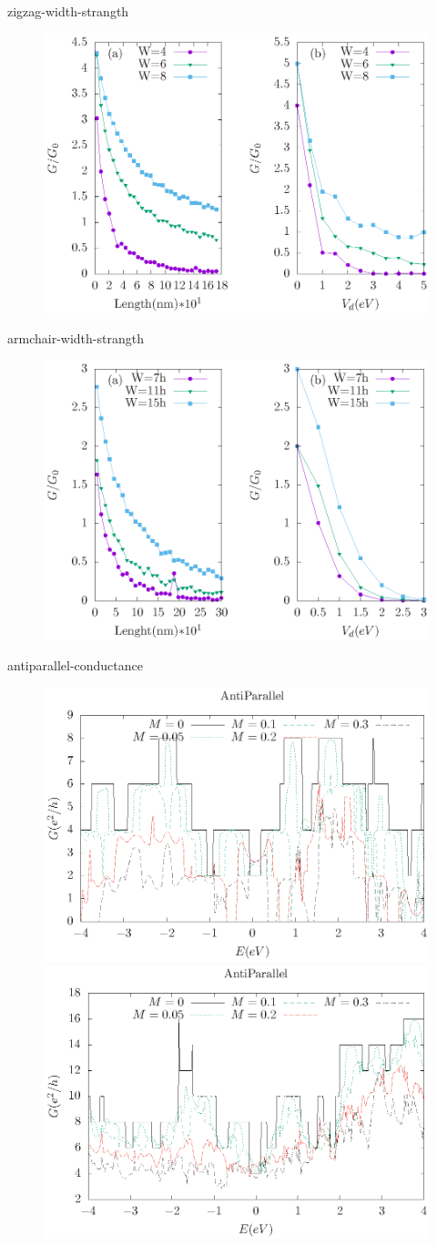 \documentclass[handout,t]{beamer}
\begin{document}
\begin{frame}{zigzag-width-strangth}
	\begin{figure}[ht]
		\centering
		\includegraphics[width=0.5\linewidth]{../figures/zigzag-width-strangth-thesis.eps}
	  \end{figure}
\end{frame}

\begin{frame}{armchair-width-strangth}
	\begin{figure}[ht]
		\centering
		\includegraphics[width=.5\linewidth]{../figures/armchair-width-strangth-thesis.eps}
	  \end{figure}
\end{frame}


\begin{frame}{antiparallel-conductance}
	\begin{figure}
		\includegraphics[width=.45\linewidth]{../figures/armchair-antiparallel-conductance-revise-thesis.eps}
		\includegraphics[width=.45\linewidth]{../figures/zigzag-antiparallel-conductance-revise-thesis.eps}
	  \end{figure}
\end{frame}
\end{document}
